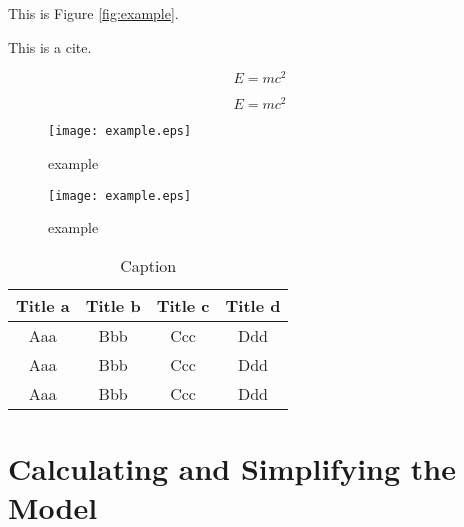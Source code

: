 \documentclass{mcmthesis}  %
\begin{document}
This is Figure \eqref{fig:example}.  %

This is a cite\cite{vaswani2017attention}.  %

\begin{equation}  %
E = mc^2 \label{aa}  %
\end{equation}  %

\begin{equation}  %
\nonumber %
E = mc^2
\end{equation}  %

\begin{figure}[h]  %
\centering  %
\begin{minipage}[c]{0.48\textwidth}  %
\centering  %
\texttt{[image: example.eps]}  %
\caption{example} \label{fig:example}  %
\end{minipage}  %
\hspace{0.02\textwidth}
\begin{minipage}[c]{0.48\textwidth}  %
\centering  %
\texttt{[image: example.eps]}  %
\caption{example} \label{fig:example}  %
\end{minipage}  %
\end{figure}  %

\begin{table}[!t]  %
\caption{Caption}  %
\label{tab1}  %
\tabcolsep 42pt %
\begin{tabular*}{\textwidth}{cccc}  %
\toprule  %
Title a & Title b & Title c & Title d \\
\midrule  %
Aaa & Bbb & Ccc & Ddd \\
Aaa & Bbb & Ccc & Ddd \\
Aaa & Bbb & Ccc & Ddd \\
\bottomrule  %
\end{tabular*}  %
\end{table}  %

\section{Calculating and Simplifying the Model}  %
\end{document}
